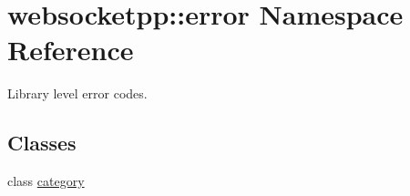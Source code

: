 \hypertarget{namespacewebsocketpp_1_1error}{}\section{websocketpp\+:\+:error Namespace Reference}
\label{namespacewebsocketpp_1_1error}


Library level error codes.  


\subsection*{Classes}
\begin{DoxyCompactItemize}
\item 
class \hyperlink{classwebsocketpp_1_1error_1_1category}{category}
\end{DoxyCompactItemize}
